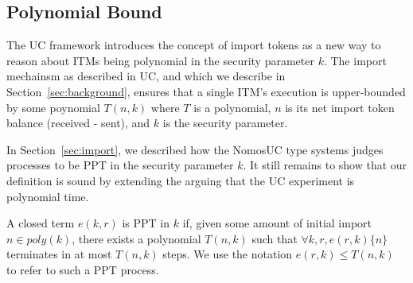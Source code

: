 
\subsection{Polynomial Bound}
The UC framework introduces the concept of import tokens as a new way to reason about ITMs being polynomial in the security parameter $k$. 
The import mechainsm as described in UC, and which we describe in Section~\ref{sec:background}, ensures that a single ITM's execution is upper-bounded by some poynomial $T(n,k)$ where $T$ is a polynomial, $n$ is its net import token balance (received - sent), and $k$ is the security parameter.

In Section~\ref{sec:import}, we described how the NomosUC type systems judges processes to be PPT in the security parameter $k$. 
It still remains to show that our definition is sound by extending the arguing that the UC experiment  is polynomial time.
\begin{ddef}[PPT in $k$]\label{def:ppt}
A closed term $e(k,r)$ is  PPT in $k$ if, given some amount of initial import $n \in poly(k)$, there exists a polynomial $T(n,k)$ such that $\forall k, r, e(r,k) \{n\}$ terminates in at most $T(n,k)$ steps.
We use the notation $e(r,k) \leq T(n,k)$ to refer to such a PPT process.
\end{ddef}

